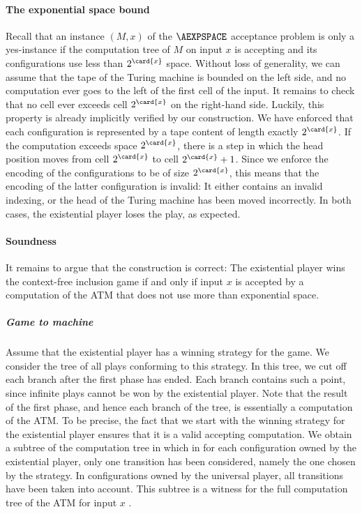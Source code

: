 \documentclass[../../diss.tex]{subfiles}
\begin{document}
\paragraph{The exponential space bound}

Recall that an instance $(M,x)$ of the $\AEXPSPACE$ acceptance problem is only a yes-instance if the computation tree of $M$ on input $x$ is accepting and its configurations use less than $2^{\card{x}}$ space.
Without loss of generality, we can assume that the tape of the Turing machine is bounded on the left side, and no computation ever goes to the left of the first cell of the input.
It remains to check that no cell ever exceeds cell $2^{\card{x}}$ on the right-hand side.
Luckily, this property is already implicitly verified by our construction.
We have enforced that each configuration is represented by a tape content of length exactly $2^{\card{x}}$.
If the computation exceeds space $2^{\card{x}}$, there is a step in which the head position moves from cell $2^{\card{x}}$ to cell $2^{\card{x}} + 1$.
Since we enforce the encoding of the configurations to be of size $2^{\card{x}}$, this means that the encoding of the latter configuration is invalid:
It either contains an invalid indexing, or the head of the Turing machine has been moved incorrectly.
In both cases, the existential player loses the play, as expected.

\paragraph{Soundness}

It remains to argue that the construction is correct:
The existential player wins the context-free inclusion game if and only if input $x$ is accepted by a computation of the ATM that does not use more than exponential space.


\subparagraph{Game to machine}

Assume that the existential player has a winning strategy for the game.
We consider the tree of all plays conforming to this strategy.
In this tree, we cut off each branch after the first phase has ended.
Each branch contains such a point, since infinite plays cannot be won by the existential player.
Note that the result of the first phase, and hence each branch of the tree, is essentially a computation of the ATM.\@
To be precise, the fact that we start with the winning strategy for the existential player ensures that it is a valid accepting computation.
We obtain a subtree of the computation tree in which in for each configuration owned by the existential player, only one transition has been considered, namely the one chosen by the strategy.
In configurations owned by the universal player, all transitions have been taken into account.
This subtree is a witness for the full computation tree of the ATM for input $x$ .
\end{document}
